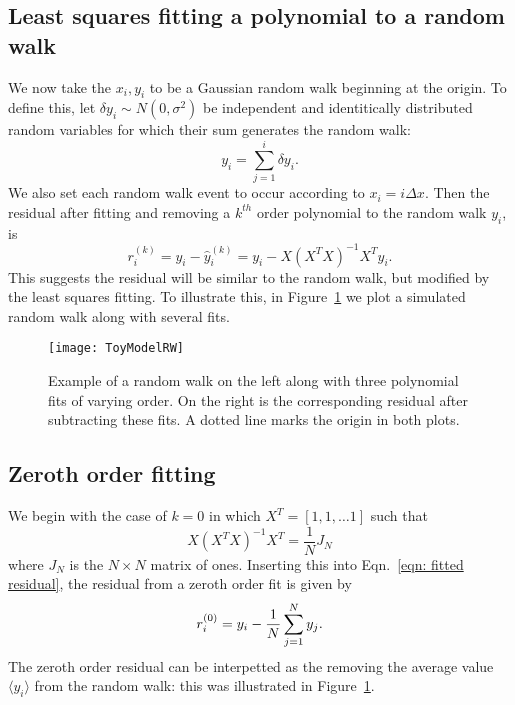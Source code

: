 \documentclass[../full_thesis/full_thesis.tex]{subfiles}
\begin{document}
\begin{subappendices}
\subsection{Least squares fitting a polynomial to a random walk} We now take
the $x_i, y_i$ to be a Gaussian random walk beginning at the origin. To define
this, let $\delta y_{i} \sim N(0, \sigma^{2})$ be independent and identitically
distributed random variables for which their sum generates the random walk:
\begin{equation}
y_{i} = \sum_{j=1}^{i}\delta y_{i}.
\label{eqn: ToyModel RW definition}
\end{equation}
We also set each random walk event to occur according to $x_{i} = i \Delta x$.
Then the residual after fitting and removing a $k^{th}$ order polynomial to the
random walk $y_i$, is
\begin{equation}
r_i^{(k)} = y_{i} - \hat{y}_{i}^{(k)} = y_{i} - X \left(X^{T}X\right)^{-1} X^{T} y_{i}.
\label{eqn: fitted residual}
\end{equation}
This suggests the residual will be similar to the random walk, but modified by
the least squares fitting.  To illustrate this, in Figure~\ref{fig: ToyModelRW}
we plot a simulated random walk along with several fits.
\begin{figure}[htb]
\centering
\texttt{[image: ToyModelRW]}
\caption{Example of a random walk on the left along with three polynomial fits
of varying order. On the right is the corresponding residual after subtracting
these fits. A dotted line marks the origin in both plots.}
\label{fig: ToyModelRW}
\end{figure}

\subsection{Zeroth order fitting}

We begin with the case of $k=0$ in which $X^{T} = [1, 1, \dots 1]$ such
that
\begin{equation}
X \left(X^{T}X\right)^{-1} X^{T} = \frac{1}{N} J_{N}
\end{equation}
where $J_{N}$ is the $N\times N$ matrix of ones.  Inserting this into
Eqn.~\eqref{eqn: fitted residual}, the residual from a zeroth order fit is
given by
\begin{equation}
r_i^{(0)}= y_{i} - \frac{1}{N} \sum_{j=1}^{N}y_{j}.
\end{equation}
The zeroth order residual can be interpetted as the removing the
average value $\langle y_i \rangle$ from the random walk: this was illustrated
in Figure~\ref{fig: ToyModelRW}.


\end{subappendices}
\end{document}
